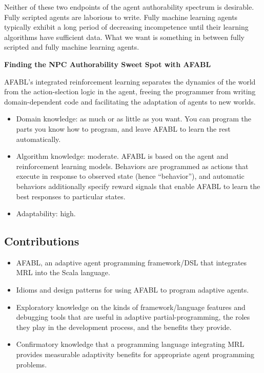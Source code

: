 Neither of these two endpoints of the agent authorability spectrum is desirable.  Fully scripted agents are laborious to write.  Fully machine learning agents typically exhibit a long period of decreasing incompetence until their learning algorithms have sufficient data.  What we want is something in between fully scripted and fully machine learning agents.


{\bf Finding the NPC Authorability Sweet Spot with AFABL}

AFABL's integrated reinforcement learning separates the dynamics of the world from the action-slection logic in the agent, freeing the programmer from writing domain-dependent code and facilitating the adaptation of agents to new worlds.

\begin{itemize}
\item Domain knowledge: as much or as little as you want.  You can program the parts you know how to program, and leave AFABL to learn the rest automatically.
\item Algorithm knowledge: moderate.  AFABL is based on the agent and
  reinforcement learning models.  Behaviors are programmed as actions
  that execute in response to observed state (hence ``behavior''), and
  automatic behaviors additionally specify reward signals that enable
  AFABL to learn the best responses to particular states.
\item Adaptability: high.
\end{itemize}


\subsection{Contributions}

\begin{itemize}
\item AFABL, an adaptive agent programming framework/DSL that integrates MRL into the Scala language.
\item Idioms and design patterns for using AFABL to program adaptive agents.
\item Exploratory knowledge on the kinds of framework/language features and debugging tools that are useful in adaptive partial-programming, the roles they play in the development process, and the benefits they provide.
\item Confirmatory knowledge that a programming language integrating MRL provides measurable adaptivity benefits for appropriate agent programming problems.
\end{itemize}

